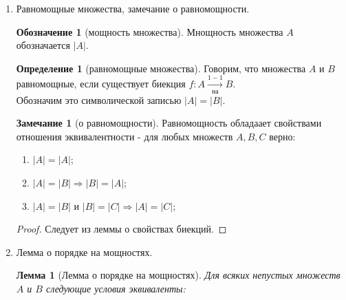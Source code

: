 \documentclass[a4paper]{article}
\newtheorem*{lemma*}{Лемма}
\theoremstyle{definition}
\newtheorem*{definition*}{Определение}
\newtheorem*{name}{Обозначение}
\newtheorem*{paradoks}{Парадокс}
\newtheorem*{comment*}{Замечание}
\begin{document}
\begin{enumerate}
\begin{paradoks}[Парадокс Рассела]
        Предположим, что само $M_{R}$ является множеством. Возможны два варианта:\\
        \begin{enumerate}
         \item $M_{R} \notin{M_{R}}$. Тогда $A - M_{R}$ подходит под определние, и $M_{R} \notin{M_{R}}$. Противоречие.
         \item $M_{R} \in{M_{R}}$. Вновь полагая, $A = M_{R}$, получаем, что по определению $M_{R} \notin{M_{R}}$. Противоречие.
        \end{enumerate}
        Это рассуждение показывает, что совокупность $M_{R}$ нельзя считать множеством.
       \end{paradoks}
       Аксиоматика ZFC.\\
       Можно с собой на листочке!!!
 \item Равномощные множества, замечание о равномощности.
       \begin{name}[мощность множества]
        Мнощность множества $A$ обозначается $|A|$.
       \end{name}
       \begin{definition*}[равномощные множества]
        Говорим, что множества $A$ и $B$ равномощные, если существует биекция $f: A \xrightarrow[ \text{на}]{1-1} B$. \\
        Обозначим это символической записью $|A| = |B|$.
       \end{definition*}
       \begin{comment*}[о равномощности]
        Равномощность обладаает свойствами отношения эквивалентности - для любых множеств $A, B, C$ верно:
        \begin{enumerate}
         \item $|A| = |A|$;
         \item $|A| = |B| \Rightarrow |B| = |A|$;
         \item $|A| = |B|$ и $|B| = |C| \Rightarrow |A| = |C|$;
        \end{enumerate}
       \end{comment*}
       \begin{proof}
        Следует из леммы о свойствах биекций.
       \end{proof}
 \item Лемма о порядке на мощностях.
       \begin{lemma*}[Лемма о порядке на мощностях]
        Для всяких непустых множеств $A$ и $B$ следующие условия эквиваленты:
        \begin{enumerate}

\end{enumerate}
\end{lemma*}
\end{enumerate}
\end{document}
